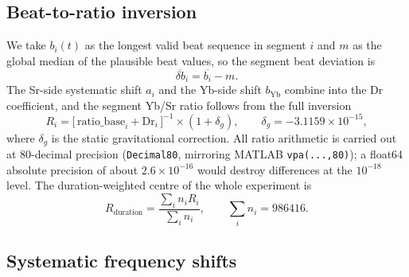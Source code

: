 \documentclass[11pt,a4paper]{article}
\newcommand{\Rdur}{R_{\mathrm{duration}}}
\newcommand{\e}[1]{\times 10^{#1}}
\begin{document}


\subsection{Beat-to-ratio inversion}
\label{app:methods-ratio}
We take $b_i(t)$ as the longest valid beat sequence in segment $i$ and
$m$ as the global median of the plausible beat values, so the segment beat
deviation is
\begin{equation}
  \overline{\delta b}_i = \overline{b_i} - m .
\end{equation}
The Sr-side systematic shift $a_i$ and the Yb-side shift $b_{\mathrm{Yb}}$
combine into the Dr coefficient, and the segment Yb/Sr ratio follows from
the full inversion
\begin{equation}
  R_i = \bigl[\,\mathrm{ratio\_base}_i + \mathrm{Dr}_i\,\bigr]^{-1}
        \times (1+\delta_g),
  \qquad \delta_g = -3.1159\e{-15},
  \label{eq:ratio}
\end{equation}
where $\delta_g$ is the static gravitational correction. All ratio
arithmetic is carried out at 80-decimal precision (\texttt{Decimal80},
mirroring MATLAB \texttt{vpa(...,80)}); a float64 absolute precision of
about $2.6\e{-16}$ would destroy differences at the $10^{-18}$ level. The
duration-weighted centre of the whole experiment is
\begin{equation}
  \Rdur = \frac{\sum_i n_i R_i}{\sum_i n_i},
  \qquad \sum_i n_i = \num{986416}.
  \label{eq:rduration}
\end{equation}


\subsection{Systematic frequency shifts}
\label{app:systematics}
\end{document}
